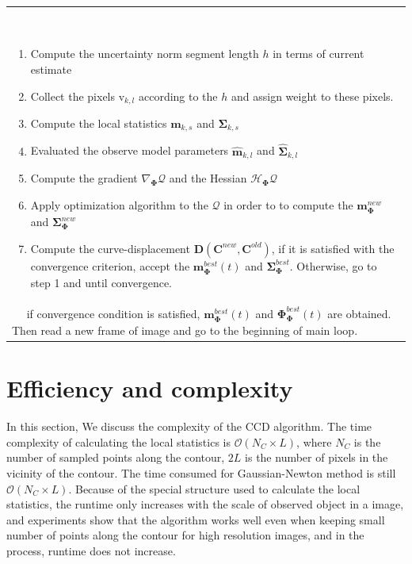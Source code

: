 \begin{table}[htbp]
\begin{tabular*}{0.9\textwidth}{!{\color{red} \vrule width 4pt}l}
\parbox{2cm}{$\quad$}\parbox{13cm}
{
  \begin{enumerate}
  \item Compute the uncertainty norm segment length $h$ in terms of
    current estimate
  \item Collect the pixels $\mathrm{v}_{k,l}$ according to the $h$ and
    assign weight to these pixels.
  \item Compute the local statistics $\mathbf{m}_{k,s}$ and $\mathbf{\Sigma}_{k,s}$
  \item Evaluated the observe model parameters
    $\hat{\mathbf{m}}_{k,l}$ and $\hat{\mathbf{\Sigma}}_{k,l}$
  \item Compute the gradient $\nabla_{\mathbf{\Phi}}\mathcal{Q}$ and the Hessian $\mathcal{H}_{\mathbf{\Phi}}\mathcal{Q}$
  \item Apply optimization algorithm to the  $\mathcal{Q}$ in order to
    to compute the $\mathbf{m}_{\mathbf{\Phi}}^{new}$ and $\mathbf{\Sigma}_{\mathbf{\Phi}}^{new}$
  \item Compute the curve-displacement $\mathbf{D}(\mathbf{C}^{new},
    \mathbf{C}^{old})$, if it is satisfied with the convergence
    criterion, accept the $\mathbf{m}_{\mathbf{\Phi}}^{best}(t)$ and
    $\mathbf{\Sigma}_{\mathbf{\Phi}}^{best}$. Otherwise, go to step 1
    and until convergence.
  \end{enumerate}
}
\\
\parbox{2cm}{$\quad$}\parbox{13cm}
{
if convergence condition is satisfied,
$\mathbf{m}_{\mathbf{\Phi}}^{best}(t)$ and
$\mathbf{\Phi}_{\mathbf{\Phi}}^{best}(t)$ are obtained. Then read a
new frame of image and go to the beginning of main loop.
}
  \end{tabular*}
\end{table}
\section{Efficiency and complexity}
\label{sec:eff}
In this section, We discuss the complexity of the CCD algorithm. 
The time complexity of calculating the local statistics is
$\mathcal{O}(N_{C}\times L)$, where $N_{C}$ is the number of sampled
points along the contour, $2L$ is the number of pixels in the vicinity
of the contour. The time consumed for Gaussian-Newton method is still
$\mathcal{O}(N_{C}\times L)$. Because of the special structure used to
calculate the local statistics, the runtime only increases with the
scale of observed object in a image, and experiments show that the algorithm
works well even when keeping small number of points along the contour for
high resolution images, and in the process, runtime does not increase.

